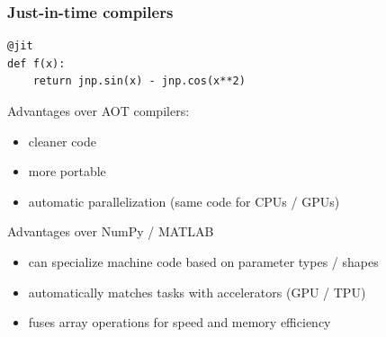 \documentclass[
    xcolor={svgnames,dvipsnames},
    hyperref={colorlinks, citecolor=DeepPink4, linkcolor=DarkRed, urlcolor=DarkBlue}
    ]{beamer}  %
\newcommand{\1}{\mathbbm 1}
\begin{document}
\begin{frame}[fragile]
    \frametitle{Just-in-time compilers}

    \vspace{0.5em}
    
    \begin{verbatim}
@jit
def f(x):
    return jnp.sin(x) - jnp.cos(x**2)
    \end{verbatim}

    \vspace{0.5em}
    Advantages over AOT compilers:

    \begin{itemize}
        \item cleaner code
    \vspace{0.5em}
        \item more portable
    \vspace{0.5em}
        \item automatic parallelization (same code for CPUs / GPUs)
    \end{itemize}

\end{frame}


\begin{frame}
    
    Advantages over NumPy / MATLAB

    \vspace{0.5em}
    \begin{itemize}
        \item can specialize machine code based on parameter types / shapes
        \vspace{0.5em}
        \item automatically matches tasks with accelerators (GPU / TPU)
        \vspace{0.5em}
        \item fuses array operations for speed and memory efficiency
    \end{itemize}

\end{frame}
\end{document}
